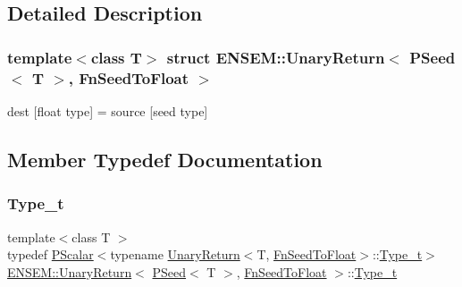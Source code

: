 \subsection{Detailed Description}
\subsubsection*{template$<$class T$>$\newline
struct E\+N\+S\+E\+M\+::\+Unary\+Return$<$ P\+Seed$<$ T $>$, Fn\+Seed\+To\+Float $>$}

dest \mbox{[}float type\mbox{]} = source \mbox{[}seed type\mbox{]} 

\subsection{Member Typedef Documentation}
\mbox{\label{structENSEM_1_1UnaryReturn_3_01PSeed_3_01T_01_4_00_01FnSeedToFloat_01_4_a0162324945d4cff5d69aa1ee87641522}} 
\subsubsection{\texorpdfstring{Type\_t}{Type\_t}\hspace{0.1cm}{\footnotesize\ttfamily [1/3]}}
{\footnotesize\ttfamily template$<$class T $>$ \\
typedef \mbox{\hyperlink{classENSEM_1_1PScalar}{P\+Scalar}}$<$typename \mbox{\hyperlink{structENSEM_1_1UnaryReturn}{Unary\+Return}}$<$T, \mbox{\hyperlink{structENSEM_1_1FnSeedToFloat}{Fn\+Seed\+To\+Float}}$>$\+::\mbox{\hyperlink{structENSEM_1_1UnaryReturn_3_01PSeed_3_01T_01_4_00_01FnSeedToFloat_01_4_a0162324945d4cff5d69aa1ee87641522}{Type\+\_\+t}}$>$ \mbox{\hyperlink{structENSEM_1_1UnaryReturn}{E\+N\+S\+E\+M\+::\+Unary\+Return}}$<$ \mbox{\hyperlink{classENSEM_1_1PSeed}{P\+Seed}}$<$ T $>$, \mbox{\hyperlink{structENSEM_1_1FnSeedToFloat}{Fn\+Seed\+To\+Float}} $>$\+::\mbox{\hyperlink{structENSEM_1_1UnaryReturn_3_01PSeed_3_01T_01_4_00_01FnSeedToFloat_01_4_a0162324945d4cff5d69aa1ee87641522}{Type\+\_\+t}}}

\mbox{\label{structENSEM_1_1UnaryReturn_3_01PSeed_3_01T_01_4_00_01FnSeedToFloat_01_4_a0162324945d4cff5d69aa1ee87641522}} 
